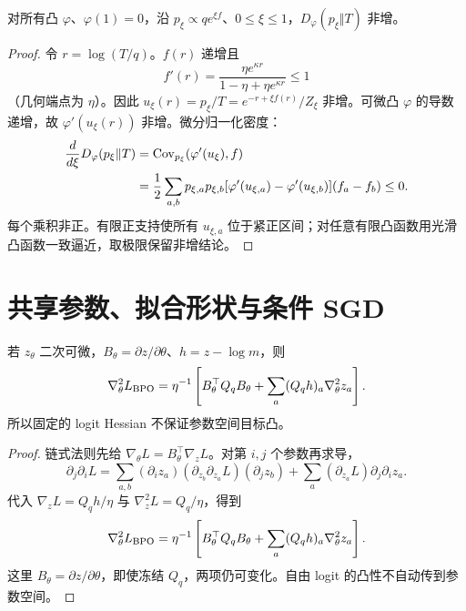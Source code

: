 \begin{theorem}[理想内层路径的教师散度进展]
对所有凸 $\varphi$、$\varphi(1)=0$，沿 $p_\xi\propto qe^{\xi f}$、$0\le\xi\le1$，$D_\varphi(p_\xi\Vert T)$ 非增。
\end{theorem}
\begin{proof}
令 $r=\log(T/q)$。$f(r)$ 递增且
\begin{equation}
f'(r)=\frac{\eta e^{\kappa r}}{1-\eta+\eta e^{\kappa r}}\le1
\end{equation}
（几何端点为 $\eta$）。因此 $u_\xi(r)=p_\xi/T=e^{-r+\xi f(r)}/Z_\xi$ 非增。可微凸 $\varphi$ 的导数递增，故 $\varphi'(u_\xi(r))$ 非增。微分归一化密度：
\begin{align}
\frac d{d\xi}D_\varphi(p_\xi\Vert T)
&=\operatorname{Cov}_{p_\xi}(\varphi'(u_\xi),f)\\
&=\frac12\sum_{a,b}p_{\xi,a}p_{\xi,b}
[\varphi'(u_{\xi,a})-\varphi'(u_{\xi,b})](f_a-f_b)\le0.
\end{align}
每个乘积非正。有限正支持使所有 $u_{\xi,a}$ 位于紧正区间；对任意有限凸函数用光滑凸函数一致逼近，取极限保留非增结论。
\end{proof}

\section{共享参数、拟合形状与条件 SGD}
\begin{proposition}
若 $z_\theta$ 二次可微，$B_\theta=\partial z/\partial\theta$、$h=z-\log m$，则
\begin{equation}
\nabla_\theta^2L_{\rm BPO}
=\eta^{-1}\left[B_\theta^\top Q_qB_\theta+\sum_a(Q_qh)_a\nabla_\theta^2z_a\right].
\end{equation}
所以固定的 logit Hessian 不保证参数空间目标凸。
\end{proposition}
\begin{proof}
链式法则先给 $\nabla_\theta L=B_\theta^\top\nabla_zL$。对第 $i,j$ 个参数再求导，
\begin{equation}
\partial_j\partial_iL
=\sum_{a,b}(\partial_i z_a)(\partial_{z_b}\partial_{z_a}L)(\partial_jz_b)
+\sum_a(\partial_{z_a}L)\partial_j\partial_i z_a.
\end{equation}
代入 $\nabla_zL=Q_qh/\eta$ 与 $\nabla_z^2L=Q_q/\eta$，得到
\begin{equation}
\nabla_\theta^2L_{\rm BPO}
=\eta^{-1}\left[B_\theta^\top Q_qB_\theta
+\sum_a(Q_qh)_a\nabla_\theta^2z_a\right].
\end{equation}
这里 $B_\theta=\partial z/\partial\theta$，即使冻结 $Q_q$，两项仍可变化。自由 logit 的凸性不自动传到参数空间。
\end{proof}

